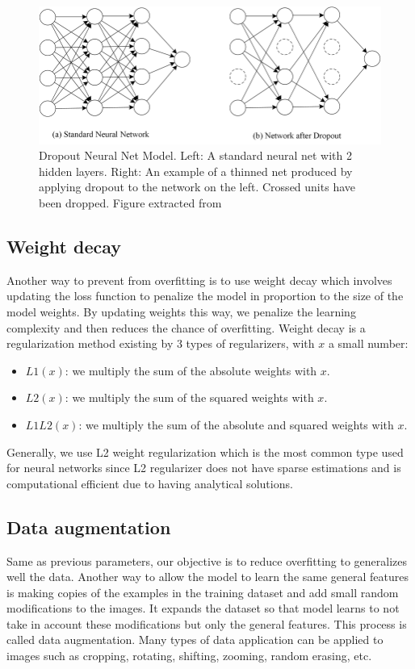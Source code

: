 \documentclass[11pt, openany]{report}
\theoremstyle{plain}
\theoremstyle{definition}
\theoremstyle{remark}
\begin{document}
\begin{figure}[h]
  \centering
  \includegraphics[scale=0.45]{figures/dropout.png}
  \caption{Dropout Neural Net Model. Left: A standard neural net with 2 hidden layers. Right: An example of a thinned net produced by applying dropout to the network on the left. Crossed units have been dropped. Figure extracted from \cite{dropout}}
  \label{fig:dropout}
\end{figure}

\newpage
\subsection{Weight decay}
Another way to prevent from overfitting is to use weight decay which involves updating the loss function to penalize the model in proportion to the size of the model weights. By updating weights this way, we penalize the learning complexity and then reduces the chance of overfitting. Weight decay is a regularization method existing by 3 types of regularizers, with $x$ a small number:
\begin{itemize}
\item $L1(x)$: we multiply the sum of the absolute weights with $x$.
\item $L2(x)$: we multiply the sum of the squared weights with $x$.
\item $L1L2(x)$: we multiply the sum of the absolute and squared weights with $x$.
\end{itemize}  
Generally, we use L2 weight regularization which is the most common type used for neural networks since L2 regularizer does not have sparse estimations and is computational efficient due to having analytical solutions. 


\subsection{Data augmentation}
Same as previous parameters, our objective is to reduce overfitting to generalizes well the data. Another way to allow the model to learn the same general features is making copies of the examples in the training dataset and add small random modifications to the images. It expands the dataset so that model learns to not take in account these modifications but only the general features. This process is called data augmentation. Many types of data application can be applied to images such as cropping, rotating, shifting, zooming, random erasing, etc.   
\end{document}
